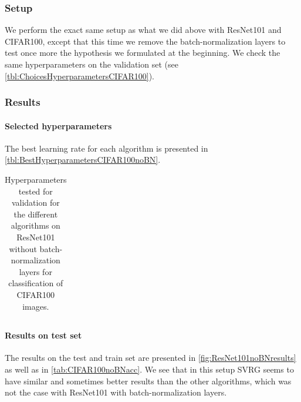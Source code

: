 \documentclass[a4paper,11pt,oneside]{report}
\begin{document}
\subsubsection{Setup}
We perform the exact same setup as what we did above with ResNet101 and CIFAR100, except that this time we remove the batch-normalization layers to test once more the hypothesis we formulated at the beginning. We check the same hyperparameters on the validation set (see \autoref{tbl:ChoicesHyperparametersCIFAR100}).

\subsubsection{Results}
\paragraph{Selected hyperparameters}
The best learning rate for each algorithm is presented in \autoref{tbl:BestHyperparametersCIFAR100noBN}.

\begin{table}
    \begin{center}
        \begin{tabular}{||c | c | l||}
             \hline
             
        \end{tabular}
    \end{center}
    \caption{Hyperparameters tested for validation for the different algorithms on ResNet101 without batch-normalization layers for classification of CIFAR100 images.
    }
    \label{tbl:BestHyperparametersCIFAR100noBN}
\end{table}

\paragraph{Results on test set}
The results on the test and train set are presented in \autoref{fig:ResNet101noBNresults} as well as in \autoref{tab:CIFAR100noBNacc}. We see that in this setup SVRG seems to have similar and sometimes better results than the other algorithms, which was not the case with ResNet101 with batch-normalization layers. 
\end{document}
